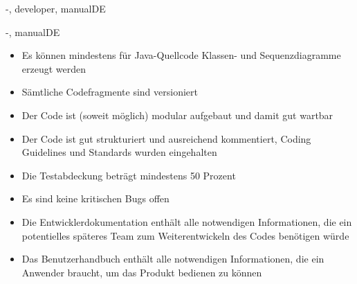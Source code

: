 \documentclass[twoside]{report}
\begin{document}
\begin{shownto}{-, developer, manualDE}
\nsecend %

\end{shownto} %
\begin{shownto}{-, manualDE}


\begin{itemize}
\item{Es können mindestens für Java-Quellcode Klassen- und Sequenzdiagramme erzeugt werden}
\item{Sämtliche Codefragmente sind versioniert}
\item{Der Code ist (soweit möglich) modular aufgebaut und damit gut wartbar}
\item{Der Code ist gut strukturiert und ausreichend kommentiert, Coding Guidelines und Standards wurden eingehalten}
\item{Die Testabdeckung beträgt mindestens 50 Prozent}
\item{Es sind keine kritischen Bugs offen}
\item{Die Entwicklerdokumentation enthält alle notwendigen Informationen, die ein potentielles späteres Team zum Weiterentwickeln des Codes benötigen würde}
\item{Das Benutzerhandbuch enthält alle notwendigen Informationen, die ein Anwender braucht, um das Produkt bedienen zu können}
\end{itemize}
\nsecend


\end{shownto}
\end{document}
